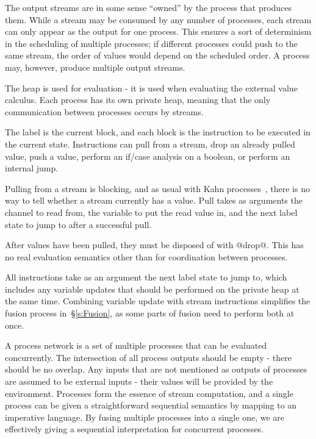 The output streams are in some sense ``owned'' by the process that produces them.
While a stream may be consumed by any number of processes, each stream can only appear as the output for one process.
This ensures a sort of determinism in the scheduling of multiple processes; if different processes could push to the same stream, the order of values would depend on the scheduled order.
A process may, however, produce multiple output streams.

The heap is used for evaluation - it is used when evaluating the external value calculus.
Each process has its own private heap, meaning that the only communication between processes occurs by streams.

The label is the current block, and each block is the instruction to be executed in the current state.
Instructions can pull from a stream, drop an already pulled value, push a value, perform an if/case analysis on a boolean, or perform an internal jump.

Pulling from a stream is blocking, and as usual with Kahn processes~\cite{kahn1976coroutines}, there is no way to tell whether a stream currently has a value.
Pull takes as arguments the channel to read from, the variable to put the read value in, and the next label state to jump to after a successful pull.

After values have been pulled, they must be disposed of with @drop@.
This has no real evaluation semantics other than for coordination between processes.

All instructions take as an argument the next label state to jump to, which includes any variable updates that should be performed on the private heap at the same time.
Combining variable update with stream instructions simplifies the fusion process in~\S\ref{s:Fusion}, as some parts of fusion need to perform both at once.


A process network is a set of multiple processes that can be evaluated concurrently.
The intersection of all process outputs should be empty - there should be no overlap.
Any inputs that are not mentioned as outputs of processes are assumed to be external inputs - their values will be provided by the environment.
Processes form the essence of stream computation, and a single process can be given a straightforward sequential semantics by mapping to an imperative language.
By fusing multiple processes into a single one, we are effectively giving a sequential interpretation for concurrent processes.


